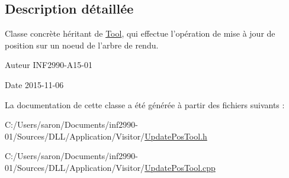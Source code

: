 \subsection{Description détaillée}
Classe concrète héritant de \hyperlink{class_tool}{Tool}, qui effectue l'opération de mise à jour de position sur un noeud de l'arbre de rendu. 

\begin{DoxyAuthor}{Auteur}
I\-N\-F2990-\/\-A15-\/01 
\end{DoxyAuthor}
\begin{DoxyDate}{Date}
2015-\/11-\/06 
\end{DoxyDate}


La documentation de cette classe a été générée à partir des fichiers suivants \-:\begin{DoxyCompactItemize}
\item 
C\-:/\-Users/saron/\-Documents/inf2990-\/01/\-Sources/\-D\-L\-L/\-Application/\-Visitor/\hyperlink{_update_pos_tool_8h}{Update\-Pos\-Tool.\-h}\item 
C\-:/\-Users/saron/\-Documents/inf2990-\/01/\-Sources/\-D\-L\-L/\-Application/\-Visitor/\hyperlink{_update_pos_tool_8cpp}{Update\-Pos\-Tool.\-cpp}\end{DoxyCompactItemize}
